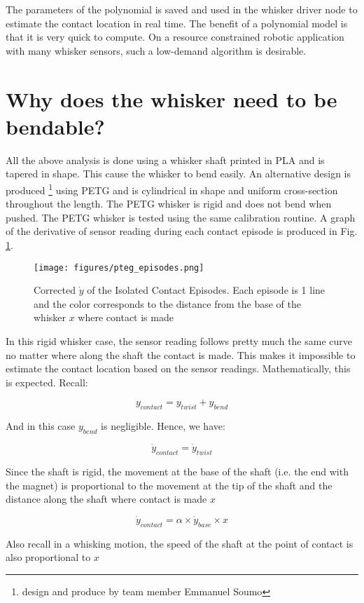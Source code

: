 \documentclass[runningheads]{llncs}
\begin{document}
The parameters of the polynomial is saved and used in the whisker driver node to estimate the contact location in real time. The benefit of a polynomial model is that it is very quick to compute. On a resource constrained robotic application with many whisker sensors, such a low-demand algorithm is desirable.

\section{Why does the whisker need to be bendable?}

All the above analysis is done using a whisker shaft printed in PLA and is tapered in shape. This cause the whisker to bend easily. An alternative design is produced \footnote{design and produce by team member Emmanuel Soumo} using PETG and is cylindrical in shape and uniform cross-section throughout the length. The PETG whisker is rigid and does not bend when pushed. The PETG whisker is tested using the same calibration routine. A graph of the derivative of sensor reading during each contact episode is produced in Fig. \ref*{fig:pteg_episodes.png}.

\begin{figure}[H]
    \centering
    \texttt{[image: figures/pteg\_episodes.png]}
    \caption{Corrected \(\dot{y}\) of the Isolated Contact Episodes. Each episode is 1 line and the color corresponds to the distance from the base of the whisker \(x\) where contact is made}
    \label{fig:pteg_episodes.png}
\end{figure}

In this rigid whisker case, the sensor reading follows pretty much the same curve no matter where along the shaft the contact is made. This makes it impossible to estimate the contact location based on the sensor readings. Mathematically, this is expected. Recall:

    \[y_{contact} = y_{twist} + y_{bend}\]

And in this case \(y_{bend}\) is negligible. Hence, we have:

    \[\dot{y}_{contact} = \dot{y}_{twist}\]

Since the shaft is rigid, the movement at the base of the shaft (i.e. the end with the magnet) is proportional to the movement at the tip of the shaft and the distance along the shaft where contact is made \(x\)

    \[\dot{y}_{contact} = \alpha\times\dot{y}_{base}\times x\]

Also recall in a whisking motion, the speed of the shaft at the point of contact is also proportional to \(x\)
\end{document}
